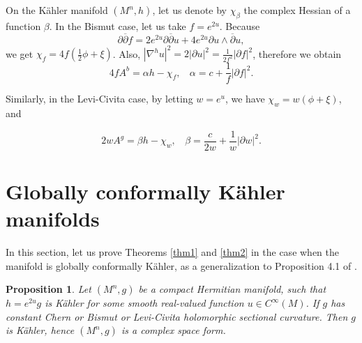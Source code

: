 \documentclass{amsart}
\newtheorem{proposition}{Proposition}
\numberwithin{equation}{section}
\begin{document}
On the K\"ahler manifold $(M^n,h)$, let us denote by $\chi_{\beta}$ the complex Hessian of a function $\beta$. In the Bismut case, let us take $f=e^{2u}$. Because
$$ \partial \overline{\partial}f = 2e^{2u}\partial \overline{\partial}u + 4e^{2u}\partial u\wedge \overline{\partial}u, $$
 we get $\chi_f = 4f (\frac12 \phi + \xi)$. Also, $|\nabla^hu|^2 = 2|\partial u|^2 = \frac{1}{2f^2}|\partial f|^2$, therefore we obtain
\begin{equation} \label{eq:Ab2}
4fA^b = \alpha h - \chi_f,  \ \ \ \ \alpha = c+\frac{1}{f}|\partial f|^2.
\end{equation}

Similarly, in the Levi-Civita case, by letting $w=e^u$, we have $\chi_w = w(\phi + \xi)$, and

\begin{equation} \label{eq:Ag2}
2wA^g = \beta h - \chi_w,  \ \ \ \ \beta = \frac{c}{2w}+\frac{1}{w}|\partial w|^2.
\end{equation}



\vspace{0.3cm}

\section{Globally conformally K\"ahler manifolds}

In this section, let us prove Theorems \ref{thm1} and \ref{thm2} in the case when the  manifold is globally conformally K\"ahler, as a generalization to Proposition 4.1 of \cite{HW}.

\begin{proposition} \label{prop2}
Let $(M^n,g)$ be a compact Hermitian manifold, such that $h=e^{2u}g$ is K\"ahler for some smooth real-valued function $u\in C^{\infty}(M)$. If $g$ has constant Chern or Bismut or Levi-Civita holomorphic sectional curvature. Then $g$ is K\"ahler, hence $(M^n,g)$ is a complex space form.
\end{proposition}
\end{document}

